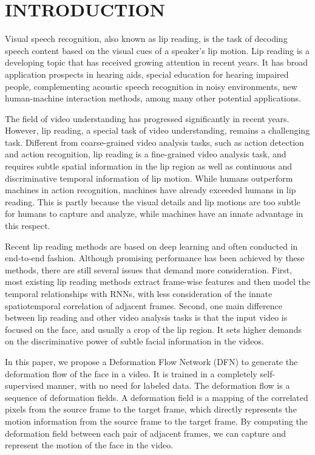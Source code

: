 \documentclass[a4paper, 10pt, conference]{ieeeconf}      \usepackage{FG2020}
\begin{document}
\section{INTRODUCTION}
Visual speech recognition, also known as lip reading, is the task of decoding speech content based on the visual cues of a speaker's lip motion. Lip reading is a developing topic that has received growing attention in recent years. It has broad application prospects in hearing aids, special education for hearing impaired people, complementing acoustic speech recognition in noisy environments, new human-machine interaction methods, among many other potential applications.
 
 The field of video understanding has progressed significantly in recent years. However, lip reading, a special task of video understanding, remains a challenging task. Different from coarse-grained video analysis tasks, such as action detection and action recognition, lip reading is a fine-grained video analysis task, and requires subtle spatial information in the lip region as well as continuous and discriminative temporal information of lip motion. While humans outperform machines in action recognition, machines have already exceeded humans in lip reading. This is partly because the visual details and lip motions are too subtle for humans to capture and analyze, while machines have an innate advantage in this respect.
 
 Recent lip reading methods are based on deep learning and often conducted in end-to-end fashion. 
 Although promising performance has been achieved by these methods, there are still several issues that demand more consideration. 
 First, most existing lip reading methods extract frame-wise features and then model the temporal relationships with RNNs, with less consideration of the innate spatiotemporal correlation of adjacent frames. Second, one main difference between lip reading and other video analysis tasks is that the input video is focused on the face, and usually a crop of the lip region. It sets higher demands on the discriminative power of subtle facial information in the videos.
 
 In this paper, we propose a Deformation Flow Network (DFN) to generate the deformation flow of the face in a video. It is trained in a completely self-supervised manner, with no need for labeled data. The deformation flow is a sequence of deformation fields. A deformation field is a mapping of the correlated pixels from the source frame to the target frame, which directly represents the motion information from the source frame to the target frame. By computing the deformation field between each pair of adjacent frames, we can capture and represent the motion of the face in the video.
 
\end{document}
